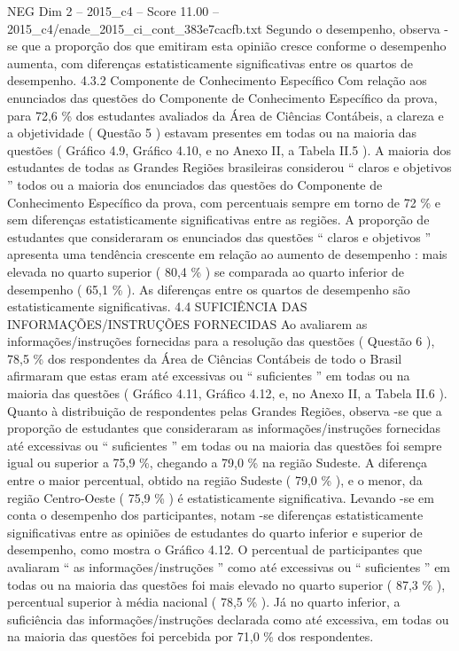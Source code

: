 \begin{textsample}{NEG Dim 2 – 2015\_c4 – Score 11.00 – 2015\_c4/enade\_2015\_ci\_cont\_383e7cacfb.txt}
Segundo o desempenho, observa -se que a proporção dos que emitiram esta opinião cresce conforme o desempenho aumenta, com diferenças estatisticamente significativas entre os quartos de desempenho. 4.3.2 Componente de Conhecimento Específico Com relação aos enunciados das questões do Componente de Conhecimento Específico da prova, para 72,6 \% dos estudantes avaliados da Área de Ciências Contábeis, a clareza e a objetividade ( Questão 5 ) estavam presentes em todas ou na maioria das questões ( Gráfico 4.9, Gráfico 4.10, e no Anexo II, a Tabela II.5 ).
A maioria dos estudantes de todas as Grandes Regiões brasileiras considerou “ claros e objetivos ” todos ou a maioria dos enunciados das questões do Componente de Conhecimento Específico da prova, com percentuais sempre em torno de 72 \% e sem diferenças estatisticamente significativas entre as regiões.
A proporção de estudantes que consideraram os enunciados das questões “ claros e objetivos ” apresenta uma tendência crescente em relação ao aumento de desempenho : mais elevada no quarto superior ( 80,4 \% ) se comparada ao quarto inferior de desempenho ( 65,1 \% ).
As diferenças entre os quartos de desempenho são estatisticamente significativas. 4.4 SUFICIÊNCIA DAS INFORMAÇÕES/INSTRUÇÕES FORNECIDAS Ao avaliarem as informações/instruções fornecidas para a resolução das questões ( Questão 6 ), 78,5 \% dos respondentes da Área de Ciências Contábeis de todo o Brasil afirmaram que estas eram até excessivas ou “ suficientes ” em todas ou na maioria das questões ( Gráfico 4.11, Gráfico 4.12, e, no Anexo II, a Tabela II.6 ).
Quanto à distribuição de respondentes pelas Grandes Regiões, observa -se que a proporção de estudantes que consideraram as informações/instruções fornecidas até excessivas ou “ suficientes ” em todas ou na maioria das questões foi sempre igual ou superior a 75,9 \%, chegando a 79,0 \% na região Sudeste.
A diferença entre o maior percentual, obtido na região Sudeste ( 79,0 \% ), e o menor, da região Centro-Oeste ( 75,9 \% ) é estatisticamente significativa.
Levando -se em conta o desempenho dos participantes, notam -se diferenças estatisticamente significativas entre as opiniões de estudantes do quarto inferior e superior de desempenho, como mostra o Gráfico 4.12.
O percentual de participantes que avaliaram “ as informações/instruções ” como até excessivas ou “ suficientes ” em todas ou na maioria das questões foi mais elevado no quarto superior ( 87,3 \% ), percentual superior à média nacional ( 78,5 \% ).
Já no quarto inferior, a suficiência das informações/instruções declarada como até excessiva, em todas ou na maioria das questões foi percebida por 71,0 \% dos respondentes.

\end{textsample}
